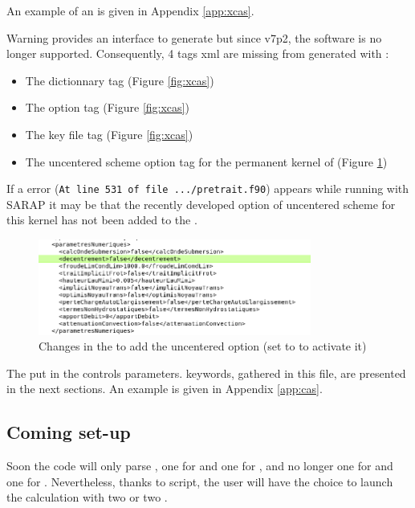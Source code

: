 An example of an \xcas is given in Appendix \ref{app:xcas}. 

\begin{WarningBlock}{Warning}
	\fudaa provides an interface to generate \xcass but since \fudaa v7p2, the software is no longer supported. Consequently, 4 tags xml are missing from \xcass generated with \fudaa :
	\begin{itemize}
		\item	The \courlis dictionnary tag (Figure \ref{fig:xcas})
		\item 	The \courlis option tag (Figure \ref{fig:xcas})
		\item	The \courlis key file tag (Figure \ref{fig:xcas})
		\item 	The uncentered scheme option tag for the permanent kernel of \mascaret (Figure \ref{fig:xcas_decentrement})
	\end{itemize}
	If a \fortran error (\verb"At line 531 of file .../pretrait.f90") appears while running \mascaret with SARAP it may be that the recently developed option of uncentered scheme for this kernel has not been added to the \xcas.
\end{WarningBlock}

\begin{figure}[htb!]
    \centering
    \includegraphics[width=0.8\textwidth]{./graphics/decentrement_xcas.png}
    \caption{Changes in the \xcas to add the uncentered option (set to  to activate it)}
    \label{fig:xcas_decentrement}
\end{figure}

The \cas put in the \xcas controls \courlis parameters.
\courlis keywords, gathered in this file, are presented in the next sections.
An example is given in Appendix \ref{app:cas}. 

\subsection{Coming set-up}
Soon the code will only parse \xcass, one for \mascaret and one for \courlis, and no longer one \xcas for \mascaret and one \cas for \courlis. Nevertheless, thanks to \python script, the user will have the choice to launch the calculation with two \cass or two \xcass.

